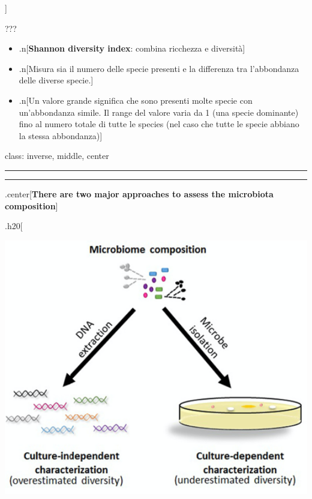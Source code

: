 \documentclass[
]{article}
\begin{document}
{]}

???

\begin{itemize}
\item
  .n{[}\textbf{Shannon diversity index}: combina ricchezza e
  diversità{]}
\item
  .n{[}Misura sia il numero delle specie presenti e la differenza tra
  l'abbondanza delle diverse specie.{]}
\item
  .n{[}Un valore grande significa che sono presenti molte specie con
  un'abbondanza simile. Il range del valore varia da 1 (una specie
  dominante) fino al numero totale di tutte le species (nel caso che
  tutte le specie abbiano la stessa abbondanza){]}
\end{itemize}

class: inverse, middle, center

\begin{center}\rule{0.5\linewidth}{0.5pt}\end{center}

\begin{center}\rule{0.5\linewidth}{0.5pt}\end{center}

.center{[}\textbf{There are two major approaches to assess the
microbiota composition}{]}

.h20{[}

\begin{center}\includegraphics[width=520px]{images/microbiotaCompositionTecniques} \end{center}
\end{document}
